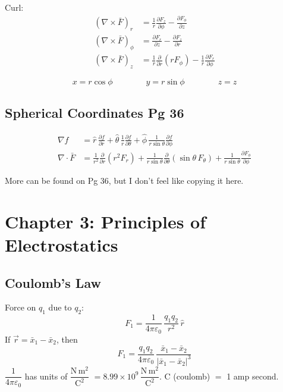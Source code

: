 \documentclass[11pt]{article}
\newcommand{\eps}{\varepsilon_0}
\begin{document}
Curl:
\begin{align*}
  (\nabla\times\bar{F})_r &= \frac{1}{r}\frac{\partial F_z}{\partial \phi} - \frac{\partial F_\phi}{\partial z}\\[1ex]
  (\nabla\times\bar{F})_\phi &= \frac{\partial F_r}{\partial z} - \frac{\partial F_z}{\partial r}\\[1ex]
  (\nabla\times\bar{F})_z &= \frac{1}{r}\frac{\partial}{\partial r}(rF_\phi) - \frac{1}{r}\frac{\partial F_r}{\partial \phi}
\end{align*}

\[
  x = r\cos\phi \qquad\qquad y = r\sin\phi \qquad\qquad z = z
\]

\subsection{Spherical Coordinates \hfill \normalfont\normalsize Pg 36}

\begin{align*}
  \nabla f &= \hat{r}\,\frac{\partial f}{\partial r} + \hat{\theta}\,\frac{1}{r}\frac{\partial f}{\partial \theta} + \hat{\phi}\,\frac{1}{r\sin\theta}\frac{\partial f}{\partial \phi}\\[1ex]
  \nabla\cdot\bar{F} &= \frac{1}{r^2}\frac{\partial}{\partial r}(r^2F_r) + \frac{1}{r\sin\theta}\frac{\partial}{\partial \theta}(\sin\theta\,F_\theta) + \frac{1}{r\sin\theta}\frac{\partial F_\phi}{\partial \phi}
\end{align*}

More can be found on Pg 36, but I don't feel like copying it here.

\section{Chapter 3: Principles of Electrostatics}

\subsection{Coulomb's Law}

Force on $q_1$ due to $q_2$:
\[
  F_1 = \frac{1}{4\pi\eps}\,\frac{q_1q_2}{r^2}\,\hat{r}
\]
If $\vec{r} = \bar{x}_1 - \bar{x}_2$, then
\[
  F_1 = \frac{q_1q_2}{4\pi\eps}\,\frac{\bar{x}_1-\bar{x}_2}{|\bar{x}_1-\bar{x}_2|^3}
\]
$\dfrac{1}{4\pi\eps}$ has units of $\dfrac{\mathrm{N\,m^2}}{\mathrm{C}^2}$ $= 8.99\times10^{9}\,\dfrac{\mathrm{N\,m^2}}{\mathrm{C}^2}$. \quad C (coulomb) $=$ 1 amp second.
\end{document}
